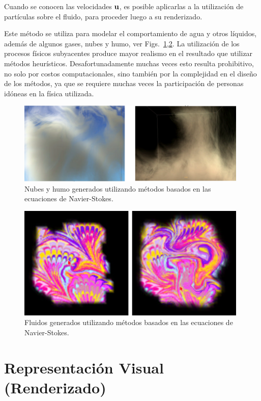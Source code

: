 Cuando se conocen las velocidades $\bold{u}$, es posible aplicarlas a la utilización de partículas sobre el fluido, para proceder luego a su renderizado.

Este método se utiliza para modelar el comportamiento de agua y otros líquidos, además de algunos gases, nubes y humo, ver Figs.~\ref{fg:fluidos1},\ref{fg:fluidos2}.
La utilización de los procesos físicos subyacentes produce mayor realismo en el resultado que utilizar métodos heurísticos.
Desafortunadamente muchas veces esto resulta prohibitivo, no solo por costos computacionales, sino también por la complejidad en el diseño de los métodos, ya que se requiere muchas veces la participación de personas idóneas en la física utilizada.


\begin{figure}
\center
\includegraphics[width=11cm]{figures/fluidos1}
\caption{Nubes y humo generados utilizando métodos basados en las ecuaciones de Navier-Stokes.}
\label{fg:fluidos1}
\end{figure}

\begin{figure}
\center
\includegraphics[width=11cm]{figures/fluidos2}
\caption{Fluidos generados utilizando métodos basados en las ecuaciones de Navier-Stokes.}
\label{fg:fluidos2}
\end{figure}


\section{Representación Visual (Renderizado)}

